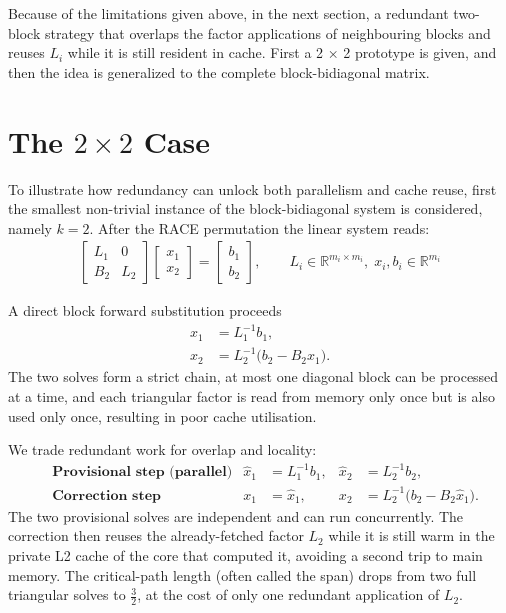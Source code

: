 Because of the limitations given above, in the next section, a redundant two-block strategy that overlaps the factor applications of neighbouring blocks and reuses $L_i$ while it is still resident in cache. First a 2 × 2 prototype is given, and then the idea is generalized to the complete block-bidiagonal matrix.

\section{The $2 \times 2$ Case}
\label{chap:meth_two_by_two}
To illustrate how redundancy can unlock both parallelism and cache reuse, first the smallest non-trivial instance of the block-bidiagonal system is considered, namely $k=2$. After the RACE permutation the linear system reads:
\begin{align}
    \begin{bmatrix}
        L_{1} & 0\\
        B_{2} & L_{2}
    \end{bmatrix}
    \begin{bmatrix}
        x_{1} \\ x_{2}
    \end{bmatrix}
    =
    \begin{bmatrix}
        b_{1} \\ b_{2}
    \end{bmatrix},
    \qquad
    L_{i}\in\mathbb R^{m_i\times m_i},\; x_{i},b_{i}\in\mathbb R^{m_i}
\end{align}

A direct block forward substitution proceeds
\begin{align}
x_{1} &= L_{1}^{-1} b_{1}, \\
x_{2} &= L_{2}^{-1}\!\bigl(b_{2}-B_{2}x_{1}\bigr).
\end{align}
The two solves form a strict chain, at most one diagonal block can be
processed at a time, and each triangular factor is read from memory only once
but is also used only once, resulting in poor cache utilisation.

We trade redundant work for overlap and locality:
\begin{align}
&\textbf{Provisional step (parallel)}          &
  \hat x_{1} &= L_{1}^{-1}b_{1},
&
  \hat x_{2} &= L_{2}^{-1}b_{2}, \\
&\textbf{Correction step } &
  x_{1} &= \hat x_{1}, 
  &
  x_{2} &= L_{2}^{-1}\!\bigl(b_{2}-B_{2}\hat x_{1}\bigr). 
\end{align}
The two provisional solves are independent and can run concurrently.  The correction then reuses the already-fetched factor $L_{2}$ while it is still warm in the private L2 cache of the core that computed it, avoiding a
second trip to main memory.  The critical-path length (often called the span) drops from two full triangular solves to
$\frac{3}{2}$, at the cost of only one redundant application of $L_{2}$.

